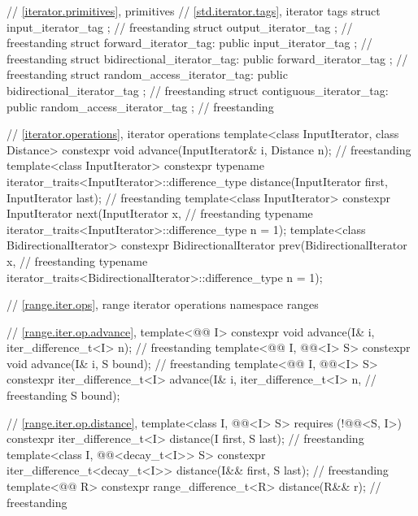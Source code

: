 \begin{codeblock}
{  // \ref{iterator.primitives}, primitives
  // \ref{std.iterator.tags}, iterator tags
  struct input_iterator_tag { };                                                    // freestanding
  struct output_iterator_tag { };                                                   // freestanding
  struct forward_iterator_tag: public input_iterator_tag { };                       // freestanding
  struct bidirectional_iterator_tag: public forward_iterator_tag { };               // freestanding
  struct random_access_iterator_tag: public bidirectional_iterator_tag { };         // freestanding
  struct contiguous_iterator_tag: public random_access_iterator_tag { };            // freestanding

  // \ref{iterator.operations}, iterator operations
  template<class InputIterator, class Distance>
    constexpr void
      advance(InputIterator& i, Distance n);                                        // freestanding
  template<class InputIterator>
    constexpr typename iterator_traits<InputIterator>::difference_type
      distance(InputIterator first, InputIterator last);                            // freestanding
  template<class InputIterator>
    constexpr InputIterator
      next(InputIterator x,                                                         // freestanding
           typename iterator_traits<InputIterator>::difference_type n = 1);
  template<class BidirectionalIterator>
    constexpr BidirectionalIterator
      prev(BidirectionalIterator x,                                                 // freestanding
           typename iterator_traits<BidirectionalIterator>::difference_type n = 1);

  // \ref{range.iter.ops}, range iterator operations
  namespace ranges {
    // \ref{range.iter.op.advance}, 
    template<@@ I>
      constexpr void advance(I& i, iter_difference_t<I> n);                         // freestanding
    template<@@ I, @@<I> S>
      constexpr void advance(I& i, S bound);                                        // freestanding
    template<@@ I, @@<I> S>
      constexpr iter_difference_t<I> advance(I& i, iter_difference_t<I> n,          // freestanding
                                             S bound);

    // \ref{range.iter.op.distance}, 
    template<class I, @@<I> S>
      requires (!@@<S, I>)
      constexpr iter_difference_t<I> distance(I first, S last);                     // freestanding
    template<class I, @@<decay_t<I>> S>
      constexpr iter_difference_t<decay_t<I>> distance(I&& first, S last);          // freestanding
    template<@@ R>
      constexpr range_difference_t<R> distance(R&& r);                              // freestanding

}}
\end{codeblock}
